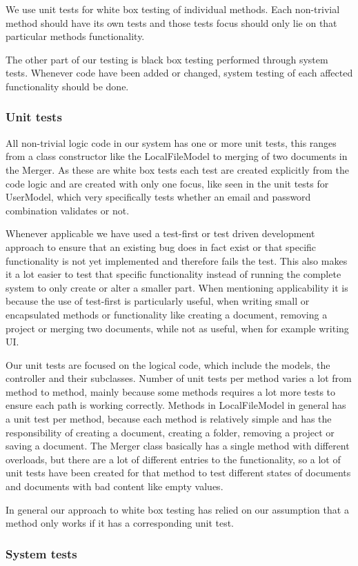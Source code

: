 We use unit tests for white box testing of individual methods. Each non-trivial method should have its own tests and those tests focus should only lie on that particular methods functionality.

The other part of our testing is black box testing performed through system tests. Whenever code have been added or changed, system testing of each affected functionality should be done.

\subsubsection{Unit tests}
All non-trivial logic code in our system has one or more unit tests, this ranges from a class constructor like the LocalFileModel to merging of two documents in the Merger. As these are white box tests each test are created explicitly from the code logic and are created with only one focus, like seen in the unit tests for UserModel, which very specifically tests whether an email and password combination validates or not.

Whenever applicable we have used a test-first or test driven development approach to ensure that an existing bug does in fact exist or that specific functionality is not yet implemented and therefore fails the test. This also makes it a lot easier to test that specific functionality instead of running the complete system to only create or alter a smaller part. When mentioning applicability it is because the use of test-first is particularly useful, when writing small  or encapsulated methods or functionality like creating a document, removing a project or merging two documents, while not as useful, when for example writing UI.

Our unit tests are focused on the logical code, which include the models, the controller and their subclasses. Number of unit tests per method varies a lot from method to method, mainly because some methods requires a lot more tests to ensure each path is working correctly. Methods in LocalFileModel in general has a unit test per method, because each method is relatively simple and has the responsibility of creating a document, creating a folder, removing a project or saving a document. The Merger class basically has a single method with different overloads, but there are a lot of different entries to the functionality, so a lot of unit tests have been created for that method to test different states of documents and documents with bad content like empty values.

In general our approach to white box testing has relied on our assumption that a method only works if it has a corresponding unit test.

\subsubsection{System tests}
